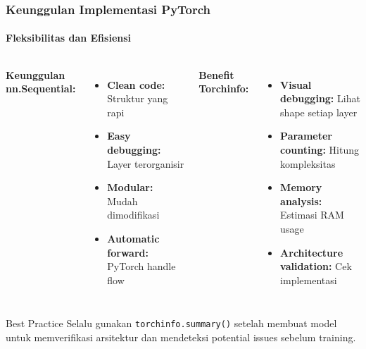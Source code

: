 \documentclass[t,aspectratio=169,xcolor=dvipsnames]{beamer}
\begin{document}
\begin{frame}
    \frametitle{Keunggulan Implementasi PyTorch}
    \framesubtitle{Fleksibilitas dan Efisiensi}
    \small

    \begin{columns}[t]
        \textbf{Keunggulan nn.Sequential:}
        \begin{itemize}
            \item \textbf{Clean code:} Struktur yang rapi
            \item \textbf{Easy debugging:} Layer terorganisir
            \item \textbf{Modular:} Mudah dimodifikasi
            \item \textbf{Automatic forward:} PyTorch handle flow
        \end{itemize}

        \textbf{Benefit Torchinfo:}
        \begin{itemize}
            \item \textbf{Visual debugging:} Lihat shape setiap layer
            \item \textbf{Parameter counting:} Hitung kompleksitas
            \item \textbf{Memory analysis:} Estimasi RAM usage
            \item \textbf{Architecture validation:} Cek implementasi
        \end{itemize}
    \end{columns}

    \begin{exampleblock}{Best Practice}
        Selalu gunakan \texttt{torchinfo.summary()} setelah membuat model untuk memverifikasi arsitektur dan mendeteksi potential issues sebelum training.
    \end{exampleblock}

\end{frame}
\end{document}
